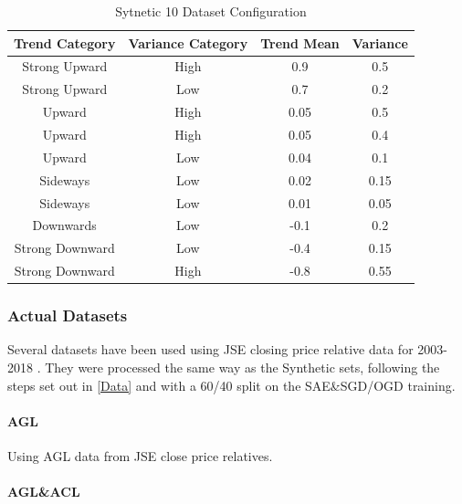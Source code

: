 \documentclass[a4paper,latin]{paper}
\begin{document}
	\begin{table}[h]
	\centering
	\begin{tabular}{|c|c|c|c|}
		\hline
		\textbf{Trend Category} &\textbf{Variance Category} & \textbf{Trend Mean} & \textbf{Variance}\\\hline	
		{Strong Upward} 		& {High} & {0.9} & {0.5} \\\hline
		{Strong Upward} 		& {Low} & {0.7} & {0.2} \\\hline
		{Upward} 					& {High} & {0.05} & {0.5} \\\hline
		{Upward} 					& {High} & {0.05} & {0.4} \\\hline
		{Upward} 					& {Low} & {0.04} & {0.1} \\\hline
		{Sideways} 					& {Low} & {0.02} & {0.15} \\\hline
		{Sideways}					& {Low} & {0.01} & {0.05} \\\hline
		{Downwards}				& {Low} & {-0.1} & {0.2} \\\hline
		{Strong Downward} 	& {Low} & {-0.4} & {0.15} \\\hline
		{Strong Downward}	& {High} & {-0.8} & {0.55} \\\hline
	\end{tabular}
	\newline\newline
	\caption{Sytnetic 10 Dataset Configuration}\label{tab_synth10}
\end{table}


\subsubsection{Actual Datasets}

Several datasets have been used using JSE closing price relative data for 2003-2018 . They were processed the same way as the Synthetic sets, following the steps set out in \ref{Data} and with a 60/40 split on the SAE\&SGD/OGD training.

\paragraph{AGL}\label{dataset_agl}

Using AGL data from JSE close price relatives.

\paragraph{AGL\&ACL}\label{dataset_aglacl}
\end{document}
